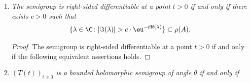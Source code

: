 \begin{example}
\begin{enumerate}[\upshape (i), wide, labelindent=.25em]
\begin{proof}
By hypothesis, the set 
%
\[
	H \coloneqq \{m(x) \colon x \in X, \Re(m(x)) \geq b\} 
\]
%
in the case $E = C_{0}(X)$ 
and%
\[
	 H \coloneqq \{m(x) \colon \Re(\lambda) \geq b \text{ and for all } \eta > 0,  
\mu(\{x \in X \colon |m(x)-\lambda| < \eta \}) \neq 0\}
\]
%
in the case $E = L^{p}$ is a bounded subset of\/ $\C$.
Thus $\lim_{t \to t'} |\eu^{tz} - \eu^{t'z}| = 0$ uniformly for $z \in H$.
Hence there exists $\delta \in \left]0,1\right]$ such that
\[
[\text{ess}]\text{-}\esssup\left\{\left|\eu^{tm(x)} - \eu^{t'm(x)}\right| \colon x \in X, \Re(m(x)) > b\right\} < \epsilon
\] 
whenever $|t-t'| < \delta$.
Together with the inequality above, we obtain that 
\[
\|T(t) - T(t')\| = [\text{ess}]\text{-}\sup\left\{\left|\eu^{tm(x)} - \eu^{t'm(x)}\right| \colon x \in X\right\} < \epsilon
\]
whenever $|t-t'| < \delta$.
We have shown that the semigroup is norm continuous for $t > 0$ whenever $\{\lambda \in \sigma(A) \colon \Re(\lambda) \geq b\}$ is bounded for all $b \in \R$.
\end{proof}
\item \label{ex:a2-1.28-2}
\textit{The semigroup is right-sided differentiable at a point $t > 0$ 
if and only if there exists $c > 0$ such that}
%
\[
	\{\lambda \in \C \colon |\Im(\lambda)| > c \cdot \eu^{-t\Re(\lambda)}\} \subset \rho(A) .
\]
%
\begin{proof}
The semigroup is right-sided differentiable at a point $t > 0$ if and only if the following equivalent assertions holds.
\end{proof}
\item \label{ex:a2-1.28-3}
\textit{$(T(t))_{t \geq 0}$ is a bounded holomorphic semigroup of angle $\theta$ if and only if} 

\end{enumerate}
\end{example}
